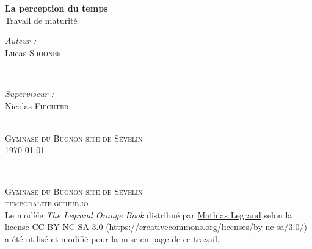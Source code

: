 \documentclass[12pt,fleqn,oneside,openany]{book} %
\begin{document}

\begingroup
\thispagestyle{empty}
\centering
\vspace*{6,8cm}
\par\normalfont\fontsize{35}{35}\sffamily\selectfont

\textbf{La perception du temps}\\
{\LARGE Travail de maturité}\par %
\vspace*{0,8cm}
\begin{minipage}{0.445\textwidth}
	\begin{flushleft} \large
		\emph{Auteur :}\\
		{\Large Lucas \textsc{Shooner}} %
	\end{flushleft}
\end{minipage}
~
\begin{minipage}{0.445\textwidth}
	\begin{flushright} \large
		\emph{Superviseur :} \\
		{\Large Nicolas \textsc{Fiechter}} %
	\end{flushright}
\end{minipage} \\ 
{{\large \textsc{Gymnase du Bugnon site de Sévelin}}} \\
{\large \today}\\ \par
\endgroup


\newpage
~\vfill
\thispagestyle{empty}

\noindent \textsc{Gymnase du Bugnon site de Sévelin}\\

\noindent \textsc{\href{https://temporalite.github.io}{temporalite.github.io}}\\ 

\noindent Le modèle \emph{The Legrand Orange Book} distribué par \href{legrand.mathias@gmail.com}{Mathias Legrand} selon la license CC BY-NC-SA 3.0 \href{https://creativecommons.org/licenses/by-nc-sa/3.0/}{ (\url{https://creativecommons.org/licenses/by-nc-sa/3.0/})} a été utilisé et modifié pour la mise en page de ce travail. \\ 
\end{document}

